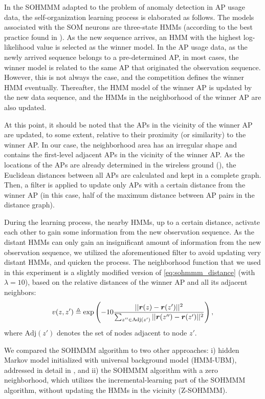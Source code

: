 In the SOHMMM adapted to the problem of anomaly detection in AP usage data, the self-organization learning process is elaborated as follows. The models associated with the SOM neurons are three-state HMMs (according to the best practice found in \citet{Anisa2017,Anisa2019}). As the new sequence arrives, an HMM with the highest log-likelihood value is selected as the winner model. In the AP usage data, as the newly arrived sequence belongs to a pre-determined AP, in most cases, the winner model is related to the same AP that originated the observation sequence. However, this is not always the case, and the competition defines the winner HMM eventually. Thereafter, the HMM model of the winner AP is updated by the new data sequence, and the HMMs in the neighborhood of the winner AP are also updated. 

At this point, it should be noted that the APs in the vicinity of the winner AP are updated, to some extent, relative to their proximity (or similarity) to the winner AP. In our case, the neighborhood area has an irregular shape and contains the first-level adjacent APs in the vicinity of the winner AP. As the locations of the APs are already determined in the wireless ground (), the Euclidean distances between all APs are calculated and kept in a complete graph. Then, a filter is applied to update only APs with a certain distance from the winner AP (in this case, half of the maximum distance between AP pairs in the distance graph). 

During the learning process, the nearby HMMs, up to a certain distance, activate each other to gain some information from the new observation sequence. As the distant HMMs can only gain an insignificant amount of information from the new observation sequence, we utilized the aforementioned filter to avoid updating very distant HMMs, and quicken the process. The neighborhood function that we used in this experiment is a slightly modified version of \eqref{eq:sohmmm_distance} (with $\lambda=10$), based on the relative distances of the winner AP and all its adjacent neighbors: 
\begin{equation}
v(z,z') \triangleq \exp\left(-10 \frac{||{\bm{r}}(z)-{\bm{r}}(z')||^{2}}{\sum_{z'' \in \mathrm{Adj}(z')}||{\bm{r}}(z'')-{\bm{r}}(z')||^{2}}\right),
\label{eq:sohmmm_distance_wifi}
\end{equation}
where $\mathrm{Adj}(z')$ denotes the set of nodes adjacent to node $z'$.

We compared the SOHMMM algorithm to two other approaches: i) hidden Markov model initialized with universal background model (HMM-UBM), addressed in detail in \cite{Anisa2017}, and ii) the SOHMMM algorithm with a zero neighborhood, which utilizes the incremental-learning part of the SOHMMM algorithm, without updating the HMMs in the vicinity (Z-SOHMMM).

